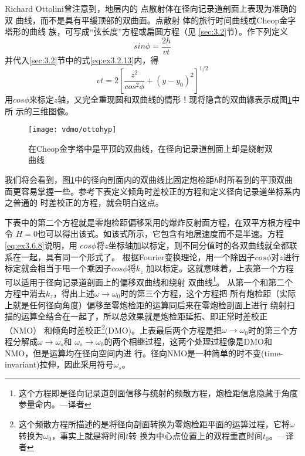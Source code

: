 Richard Ottolini曾注意到，地层内的
点散射体在径向记录道剖面上表现为准确的双
曲线，而不是具有平缓顶部的双曲面。点散射
体的旅行时间曲线或Cheop金字塔形的曲线
族，可写成“弦长度”方程或扁圆方程（见
\ref{sec:3.2}节）。作下列定义
\begin{equation}
sin\phi = \frac{2h}{vt}
\label{eq:ex3.6.7}
\end{equation}
并代入\ref{sec:3.2}节中的式\ref{eq:ex3.2.13}内，得
\begin{equation}
vt=2[\frac{z^2}{cos^2\phi}+(y-y_0)^2]^{1/2}
\label{eq:ex3.6.8}
\end{equation}
用$cos\phi$来标定$z$轴，又完全重现圆和双曲线的情形！现将隐含的双曲緣表示成图\ref{fig:vdmo/ottohyp}中所
示的三维图像。

\begin{figure}[H]
\centering
\texttt{[image: vdmo/ottohyp]}
\caption[ottohyp]{在Cheop金字塔中是平顶的双曲线，在径向记录道剖面上却是绕射双曲线}
\label{fig:vdmo/ottohyp}
\end{figure}

我们将会看到，图\ref{fig:vdmo/ottohyp}中的径向剖面内的双曲线比固定炮检距$h$时所看到的平顶双曲
面更容易掌握一些。参考下表定义倾角时差校正的方程和定义径向记录道坐标系内之普通的
时差校正的方程，就会明白这点。

下表中的第二个方裎就是零炮检距偏移采用的爆炸反射面方程，在双平方根方程中令
$H=0$也可以得出该式。如该式所示，它包含有地层速度而不是半速。方程\ref{eq:ex3.6.8}说明，用
$cos\phi$将$z$坐标轴加以标定，则不同分值时的各双曲线就全都联系在一起，具有同一个形式了。
根据Fourier变换理论，用一个除因子$cos\phi$对$z$进行标定就会相当于甩一个乘因子$cos\phi$将$k_z$
加以标定。这就意味着，上表第一个方程可以适用于径向记录道剖面上的偏移双曲线和绕射
双曲线\footnote{
这个方程即是径向记录道剖面信移与统射的频散方程，炮检距信息隐藏于角度参量命内。---译者}。
从第一个和第二个方程中消去$k_z$，得出上述$\omega\rightarrow\omega_0$时的第三个方程，这个方程把
所有炮检距（实际上就是任何径向角度）偏移至零炮检距的运算同后来在零炮检剖面上进行
绕射扫描的运算全结合在一起了，所以总效果就是炮检距延拓、即正常时差校正（NMO）
和倾角时差校正\footnote{
这个频散方程所描述的是将径向剖面转换为零炮检距平面的运箅过程，它将$\omega$转换为$\omega_0$，事实上就是将时间$t$转
换为中心点位置上的双程垂直时间$t_0$。---译者
}(DMO)。上表最后两个方程是把$\omega\rightarrow\omega_0$时的第三个方程分解成$\omega\rightarrow\omega_s$和
$\omega_s\rightarrow\omega_0$的两个相继过程，这两个处理过程像是DMO和NMO，但是运算均在径向空间内进
行。径向NMO是一种简单的时不变(time-invariant)拉伸，因此采用符号$\omega_s$。

